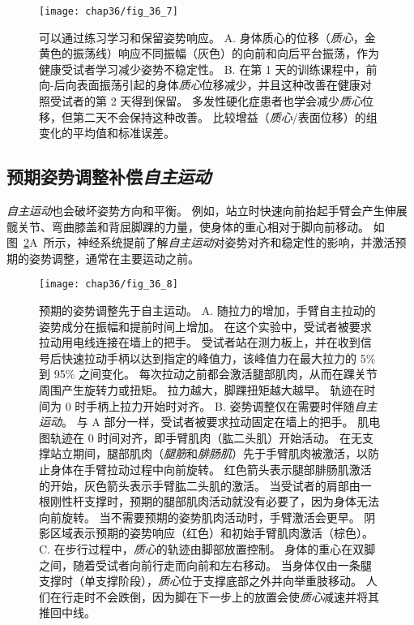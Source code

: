 \begin{figure}[htbp]
	\centering
	\texttt{[image: chap36/fig\_36\_7]}
	\caption{可以通过练习学习和保留姿势响应。
		A. 身体质心的位移（\textit{质心}，金黄色的振荡线）响应不同振幅（灰色）的向前和向后平台振荡，作为健康受试者学习减少姿势不稳定性。
		B. 在第 1 天的训练课程中，前向-后向表面振荡引起的身体\textit{质心}位移减少，并且这种改善在健康对照受试者的第 2 天得到保留。
		多发性硬化症患者也学会减少\textit{质心}位移，但第二天不会保持这种改善。
		比较增益（\textit{质心}/表面位移）的组变化的平均值和标准误差\cite{gera2016postural}。}
	\label{fig:36_7}
\end{figure}



\subsection{预期姿势调整补偿\textit{自主运动}}

\textit{自主运动}也会破坏姿势方向和平衡。
例如，站立时快速向前抬起手臂会产生伸展髋关节、弯曲膝盖和背屈脚踝的力量，使身体的重心相对于脚向前移动。
如图~\ref{fig:36_8}A~所示，神经系统提前了解\textit{自主运动}对姿势对齐和稳定性的影响，并激活预期的姿势调整，通常在主要运动之前。


\begin{figure}[htbp]
	\centering
	\texttt{[image: chap36/fig\_36\_8]}
	\caption{预期的姿势调整先于自主运动。
		A. 随拉力的增加，手臂自主拉动的姿势成分在振幅和提前时间上增加。
		在这个实验中，受试者被要求拉动用电线连接在墙上的把手。
		受试者站在测力板上，并在收到信号后快速拉动手柄以达到指定的峰值力，该峰值力在最大拉力的 5\% 到 95\% 之间变化。
		每次拉动之前都会激活腿部肌肉，从而在踝关节周围产生旋转力或扭矩。
		拉力越大，脚踝扭矩越大越早。
		轨迹在时间为 0 时手柄上拉力开始时对齐\cite{lee1990organization}。
		B. 姿势调整仅在需要时伴随\textit{自主运动}。
		与 A 部分一样，受试者被要求拉动固定在墙上的把手。
		肌电图轨迹在 0 时间对齐，即手臂肌肉（肱二头肌）开始活动。
		在无支撑站立期间，腿部肌肉（\textit{腿筋}和\textit{腓肠肌}）先于手臂肌肉被激活，以防止身体在手臂拉动过程中向前旋转。
		红色箭头表示腿部腓肠肌激活的开始，灰色箭头表示手臂肱二头肌的激活。
		当受试者的肩部由一根刚性杆支撑时，预期的腿部肌肉活动就没有必要了，因为身体无法向前旋转。
		当不需要预期的姿势肌肉活动时，手臂激活会更早。
		阴影区域表示预期的姿势响应（红色）和初始手臂肌肉激活（棕色）\cite{cordo1982properties}。
		C. 在步行过程中，\textit{质心}的轨迹由脚部放置控制。
		身体的重心在双脚之间，随着受试者向前行走而向前和左右移动。
		当身体仅由一条腿支撑时（单支撑阶段），\textit{质心}位于支撑底部之外并向举重肢移动。
		人们在行走时不会跌倒，因为脚在下一步上的放置会使\textit{质心}减速并将其推回中线\cite{mackinnon1993control}。}
	\label{fig:36_8}
\end{figure}


